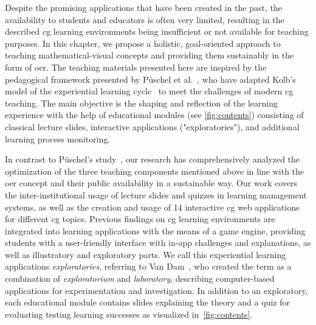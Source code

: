 Despite the promising applications that have been created in the past, the availability to students and educators is often very limited, resulting in the described \acrshort{cg} learning environments being insufficient or not available for teaching purposes. In this chapter, we propose a holistic, goal-oriented approach to teaching mathematical-visual concepts and providing them sustainably in the form of \acrshort{oer}. The teaching materials presented here are inspired by the pedagogical framework presented by Püschel et al.~\cite{pueschel:2013:MRCG}, who have adapted Kolb's model of the experiential learning cycle~\cite{kolb:1984:experiential} to meet the challenges of modern \acrshort{cg} teaching. The main objective is the shaping and reflection of the learning experience with the help of educational modules (see \autoref{fig:contents}) consisting of classical lecture slides, interactive applications ("exploratories"), and additional learning process monitoring.

In contrast to Püschel's study~\cite{pueschel:2013:MRCG}, our research has comprehensively analyzed the optimization of the three teaching components mentioned above in line with the \acrshort{oer} concept and their public availability in a sustainable way. Our work covers the inter-institutional usage of lecture slides and quizzes in learning management systems, as well as the creation and usage of 14 interactive \acrshort{cg} web applications for different \acrshort{cg} topics. Previous findings on \acrshort{cg} learning environments are integrated into learning applications with the means of a game engine, providing students with a user-friendly interface with in-app challenges and explanations, as well as illustratory and exploratory parts. We call this experiential learning applications \emph{exploratories}, referring to Van Dam~\cite{vanDam:1999:education}, who created the term as a combination of \emph{exploratorium} and \emph{laboratory}, describing computer-based applications for experimentation and investigation. In addition to an exploratory, each educational module contains slides explaining the theory and a quiz for evaluating testing learning successes as visualized in~\autoref{fig:contents}.

